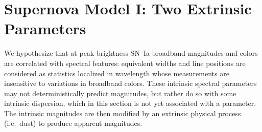 \documentclass{aastex61}   	%
\begin{document}
\section{Supernova Model I: Two Extrinsic Parameters}
\label{model:sec}

We hypothesize that at peak brightness
SN~Ia broadband magnitudes and colors are correlated with
spectral features: equivalent widths and line positions are considered as statistics localized in wavelength whose measurements are insensitive to variations in
broadband colors.
These intrinsic spectral  parameters may not deterministically predict magnitudes, but rather do so with some intrinsic dispersion,
which in this section is not yet associated with a parameter. The intrinsic magnitudes are then
modified by an extrinsic physical process (i.e.\ dust) to produce apparent magnitudes.
\end{document}
